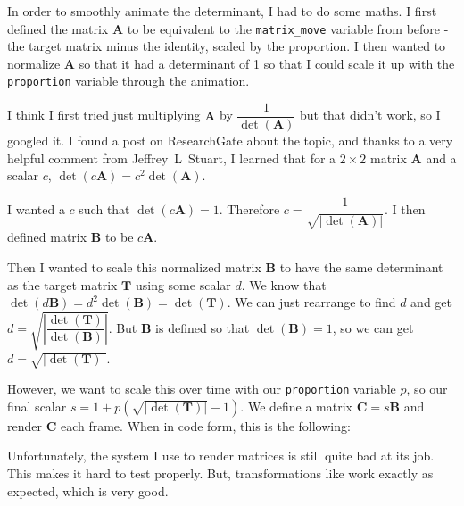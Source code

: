 \documentclass[../development.tex]{subfiles}
\begin{document}
In order to smoothly animate the determinant, I had to do some maths. I first defined the matrix $\mathbf{A}$ to be equivalent to the \texttt{matrix\_move} variable from before - the target matrix minus the identity, scaled by the proportion. I then wanted to normalize $\mathbf{A}$ so that it had a determinant of 1 so that I could scale it up with the \texttt{proportion} variable through the animation.

I think I first tried just multiplying $\mathbf{A}$ by $\dfrac{1}{\det(\mathbf{A})}$ but that didn't work, so I googled it. I found a post\cite{researchgate-normalize-determinant} on ResearchGate about the topic, and thanks to a very helpful comment from Jeffrey~L~Stuart, I learned that for a $2 \times 2$ matrix $\mathbf{A}$ and a scalar $c$, $\det(c \mathbf{A}) = c^2 \det(\mathbf{A})$.

I wanted a $c$ such that $\det(c \mathbf{A}) = 1$. Therefore $c = \dfrac{1}{\sqrt{|\det(\mathbf{A})|}}$. I then defined matrix $\mathbf{B}$ to be $c\mathbf{A}$.

Then I wanted to scale this normalized matrix $\mathbf{B}$ to have the same determinant as the target matrix $\mathbf{T}$ using some scalar $d$. We know that $\det(d \mathbf{B}) = d^2 \det(\mathbf{B}) = \det(\mathbf{T})$. We can just rearrange to find $d$ and get $d = \sqrt{\left|\dfrac{\det(\mathbf{T})}{\det(\mathbf{B})}\right|}$. But $\mathbf{B}$ is defined so that $\det(\mathbf{B}) = 1$, so we can get $d = \sqrt{|\det(\mathbf{T})|}$.

However, we want to scale this over time with our \texttt{proportion} variable $p$, so our final scalar $s = 1 + p \left(\sqrt{|\det(\mathbf{T})|} - 1\right)$. We define a matrix $\mathbf{C} = s \mathbf{B}$ and render $\mathbf{C}$ each frame. When in code form, this is the following:


Unfortunately, the system I use to render matrices is still quite bad at its job. This makes it hard to test properly. But, transformations like  work exactly as expected, which is very good.
\end{document}
